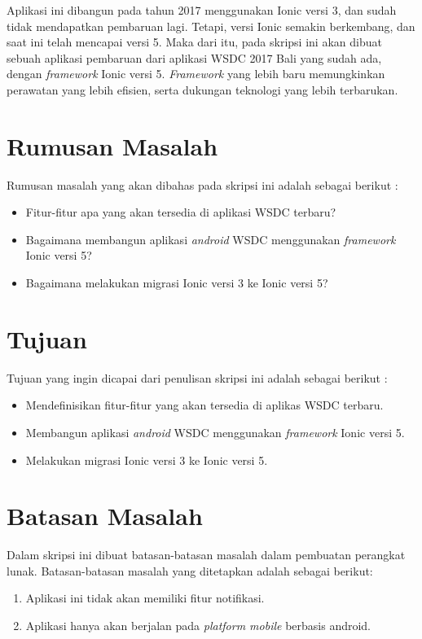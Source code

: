 Aplikasi ini dibangun pada tahun 2017 menggunakan Ionic versi 3, dan sudah tidak mendapatkan pembaruan lagi. Tetapi, versi Ionic semakin berkembang, dan saat ini telah mencapai versi 5. Maka dari itu, pada skripsi ini akan dibuat sebuah aplikasi pembaruan dari aplikasi WSDC 2017 Bali yang sudah ada, dengan \textit{framework} Ionic versi 5. \textit{Framework} yang lebih baru memungkinkan perawatan yang lebih efisien, serta dukungan teknologi yang lebih terbarukan.

\newpage
\section{Rumusan Masalah}
\label{sec:rumusan}
Rumusan masalah yang akan dibahas pada skripsi ini adalah sebagai berikut :
\begin{itemize}
	\item Fitur-fitur apa yang akan tersedia di aplikasi WSDC terbaru?
	\item Bagaimana membangun aplikasi {\it android} WSDC menggunakan {\it framework} Ionic versi 5?
	\item Bagaimana melakukan migrasi Ionic versi 3 ke Ionic versi 5?
\end{itemize}


\section{Tujuan}
\label{sec:tujuan}
Tujuan yang ingin dicapai dari penulisan skripsi ini adalah sebagai berikut :
\begin{itemize}
	\item Mendefinisikan fitur-fitur yang akan tersedia di aplikas WSDC terbaru.
	\item Membangun aplikasi {\it android} WSDC menggunakan {\it framework} Ionic versi 5.
	\item Melakukan migrasi Ionic versi 3 ke Ionic versi 5.
\end{itemize}


\section{Batasan Masalah}
\label{sec:batasan}
Dalam skripsi ini dibuat batasan-batasan masalah dalam pembuatan perangkat lunak.  Batasan-batasan masalah yang ditetapkan adalah sebagai berikut:

\begin{enumerate}
    \item Aplikasi ini tidak akan memiliki fitur notifikasi.
    \item Aplikasi hanya akan berjalan pada \textit{platform mobile} berbasis android. 
\end{enumerate}


